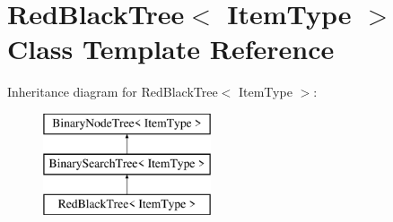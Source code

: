 \hypertarget{class_red_black_tree}{}\section{Red\+Black\+Tree$<$ Item\+Type $>$ Class Template Reference}
\label{class_red_black_tree}
Inheritance diagram for Red\+Black\+Tree$<$ Item\+Type $>$\+:\begin{figure}[H]
\begin{center}
\leavevmode
\includegraphics[height=3.000000cm]{class_red_black_tree}
\end{center}
\end{figure}
